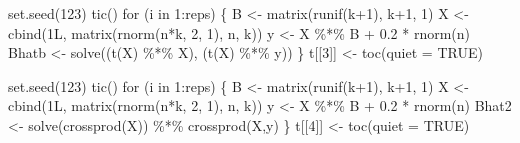 \documentclass[
  letterpaper,
]{book}
\newenvironment{Shaded}{\begin{snugshade}}{\end{snugshade}}
\newcommand{\AttributeTok}[1]{\textcolor[rgb]{0.40,0.45,0.13}{#1}}
\newcommand{\ConstantTok}[1]{\textcolor[rgb]{0.56,0.35,0.01}{#1}}
\newcommand{\ControlFlowTok}[1]{\textcolor[rgb]{0.00,0.23,0.31}{#1}}
\newcommand{\DecValTok}[1]{\textcolor[rgb]{0.68,0.00,0.00}{#1}}
\newcommand{\FloatTok}[1]{\textcolor[rgb]{0.68,0.00,0.00}{#1}}
\newcommand{\FunctionTok}[1]{\textcolor[rgb]{0.28,0.35,0.67}{#1}}
\newcommand{\NormalTok}[1]{\textcolor[rgb]{0.00,0.23,0.31}{#1}}
\newcommand{\OtherTok}[1]{\textcolor[rgb]{0.00,0.23,0.31}{#1}}
\newcommand{\SpecialCharTok}[1]{\textcolor[rgb]{0.37,0.37,0.37}{#1}}
\begin{document}
\begin{Shaded}
\begin{Highlighting}[]
\FunctionTok{set.seed}\NormalTok{(}\DecValTok{123}\NormalTok{)}
\FunctionTok{tic}\NormalTok{()}
\ControlFlowTok{for}\NormalTok{ (i }\ControlFlowTok{in} \DecValTok{1}\SpecialCharTok{:}\NormalTok{reps) \{ }
\NormalTok{  B }\OtherTok{\textless{}{-}} \FunctionTok{matrix}\NormalTok{(}\FunctionTok{runif}\NormalTok{(k}\SpecialCharTok{+}\DecValTok{1}\NormalTok{), k}\SpecialCharTok{+}\DecValTok{1}\NormalTok{, }\DecValTok{1}\NormalTok{)}
\NormalTok{  X }\OtherTok{\textless{}{-}} \FunctionTok{cbind}\NormalTok{(1L, }\FunctionTok{matrix}\NormalTok{(}\FunctionTok{rnorm}\NormalTok{(n}\SpecialCharTok{*}\NormalTok{k, }\DecValTok{2}\NormalTok{, }\DecValTok{1}\NormalTok{), n, k))}
\NormalTok{  y }\OtherTok{\textless{}{-}}\NormalTok{ X }\SpecialCharTok{\%*\%}\NormalTok{ B }\SpecialCharTok{+} \FloatTok{0.2} \SpecialCharTok{*} \FunctionTok{rnorm}\NormalTok{(n) }
\NormalTok{  Bhatb }\OtherTok{\textless{}{-}} \FunctionTok{solve}\NormalTok{((}\FunctionTok{t}\NormalTok{(X) }\SpecialCharTok{\%*\%}\NormalTok{ X), (}\FunctionTok{t}\NormalTok{(X) }\SpecialCharTok{\%*\%}\NormalTok{ y)) }
\NormalTok{  \}}
\NormalTok{t[[}\DecValTok{3}\NormalTok{]] }\OtherTok{\textless{}{-}} \FunctionTok{toc}\NormalTok{(}\AttributeTok{quiet =} \ConstantTok{TRUE}\NormalTok{)}

\FunctionTok{set.seed}\NormalTok{(}\DecValTok{123}\NormalTok{)}
\FunctionTok{tic}\NormalTok{()}
\ControlFlowTok{for}\NormalTok{ (i }\ControlFlowTok{in} \DecValTok{1}\SpecialCharTok{:}\NormalTok{reps) \{ }
\NormalTok{  B }\OtherTok{\textless{}{-}} \FunctionTok{matrix}\NormalTok{(}\FunctionTok{runif}\NormalTok{(k}\SpecialCharTok{+}\DecValTok{1}\NormalTok{), k}\SpecialCharTok{+}\DecValTok{1}\NormalTok{, }\DecValTok{1}\NormalTok{)}
\NormalTok{  X }\OtherTok{\textless{}{-}} \FunctionTok{cbind}\NormalTok{(1L, }\FunctionTok{matrix}\NormalTok{(}\FunctionTok{rnorm}\NormalTok{(n}\SpecialCharTok{*}\NormalTok{k, }\DecValTok{2}\NormalTok{, }\DecValTok{1}\NormalTok{), n, k))}
\NormalTok{  y }\OtherTok{\textless{}{-}}\NormalTok{ X }\SpecialCharTok{\%*\%}\NormalTok{ B }\SpecialCharTok{+} \FloatTok{0.2} \SpecialCharTok{*} \FunctionTok{rnorm}\NormalTok{(n) }
\NormalTok{  Bhat2 }\OtherTok{\textless{}{-}} \FunctionTok{solve}\NormalTok{(}\FunctionTok{crossprod}\NormalTok{(X)) }\SpecialCharTok{\%*\%} \FunctionTok{crossprod}\NormalTok{(X,y) }
\NormalTok{  \}}
\NormalTok{t[[}\DecValTok{4}\NormalTok{]] }\OtherTok{\textless{}{-}} \FunctionTok{toc}\NormalTok{(}\AttributeTok{quiet =} \ConstantTok{TRUE}\NormalTok{)}


\end{Highlighting}
\end{Shaded}
\end{document}

